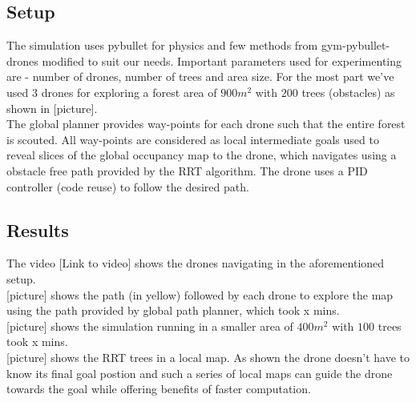 \subsection{Setup}

The simulation uses pybullet for physics and few methods from gym-pybullet-drones modified to suit our needs. Important parameters used for experimenting are - number of drones, number of trees and area size. For the most part we've used $3$ drones for exploring a forest area of $900m^2$ with $200$ trees (obstacles) as shown in [picture]. \\

The global planner provides way-points for each drone such that the entire forest is scouted. All way-points are considered as local intermediate goals used to reveal slices of the global occupancy map to the drone, which navigates using a obstacle free path provided by the RRT algorithm. The drone uses a PID controller (code reuse) to follow the desired path.\\

\subsection{Results}

The video [Link to video] shows the drones navigating in the aforementioned setup.\\

[picture] shows the path (in yellow) followed by each drone to explore the map using the path provided by global path planner, which took x mins. \\

[picture] shows the simulation running in a smaller area of $400m^2$ with $100$ trees took x mins. \\

[picture] shows the RRT trees in a local map. As shown the drone doesn't have to know its final goal postion and such a series of local maps can guide the drone towards the goal while offering benefits of faster computation.